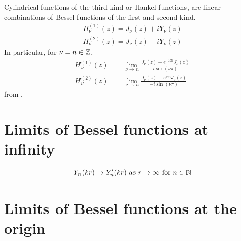 \begin{defn}\label{defn:hankel_func}
  Cylindrical functions of the third kind or Hankel functions, are linear combinations of Bessel functions of the first and second kind.
    \begin{align*}
        H^{(1)}_\nu(z) = J_\nu(z) + i Y_\nu(z)\\
        H^{(2)}_\nu(z) = J_\nu(z) - i Y_\nu(z)
    \end{align*}
  In particular, for $\nu = n \in \mathbb{Z}$,
    \begin{align*}
      H^{(1)}_\nu(z)
        &= \lim_{\nu \rightarrow n} \frac{J_{\nu}(z) - e^{-\nu\pi i} J_\nu(z)}{i \sin(\nu \pi)} \\
      H^{(2)}_\nu(z)
        &= \lim_{\nu \rightarrow n} \frac{J_{\nu}(z) - e^{\nu\pi i} J_\nu(z)}{- i \sin(\nu \pi)}
    \end{align*}
  from \cite{karmazina19cylinderfunc}.
\end{defn}

\section{Limits of Bessel functions at infinity}
\begin{propn}
  \[ Y_n(kr) \rightarrow Y'_n(kr) \text{ as } r \rightarrow \infty \text{ for } n \in \mathbb{N}\]

\end{propn}

\section{Limits of Bessel functions at the origin}\label{ss:limits_of_bessel_functions}

